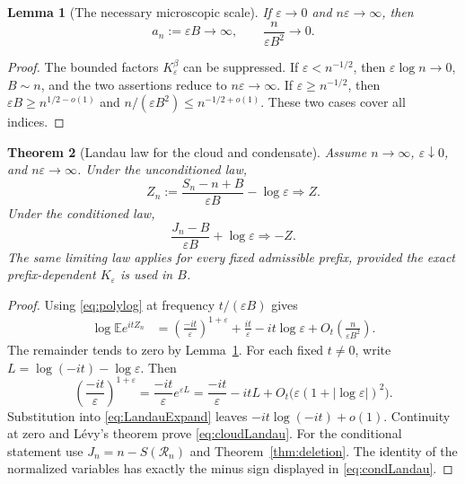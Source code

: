 \documentclass[11pt,a4paper]{article}
\newtheorem{theorem}{Theorem}[section]
\newtheorem{lemma}[theorem]{Lemma}
\theoremstyle{definition}\newtheorem{definition}[theorem]{Definition}
\theoremstyle{remark}\newtheorem{remark}[theorem]{Remark}
\newcommand{\eps}{\varepsilon}
\newcommand{\E}{\mathbb E}
\newcommand{\1}{\mathbf 1}
\begin{document}
\begin{lemma}[The necessary microscopic scale]\label{lem:scale}
If $\eps\to0$ and $n\eps\to\infty$, then
\begin{equation}\label{eq:smallscale}
 a_n:=\eps B\to\infty,
 \qquad \frac n{\eps B^2}\to0.
\end{equation}
\end{lemma}
\begin{proof}
The bounded factors $K_{\eps}^{\beta}$ can be suppressed. If
$\eps<n^{-1/2}$, then $\eps\log n\to0$, $B\sim n$, and the two
assertions reduce to $n\eps\to\infty$. If $\eps\ge n^{-1/2}$, then
$\eps B\ge n^{1/2-o(1)}$ and
$n/(\eps B^2)\le n^{-1/2+o(1)}$. These two cases cover all indices.
\end{proof}

\begin{theorem}[Landau law for the cloud and condensate]
\label{thm:landau}
Assume $n\to\infty$, $\eps\downarrow0$, and $n\eps\to\infty$.
Under the unconditioned law,
\begin{equation}\label{eq:cloudLandau}
 Z_n:=\frac{S_n-n+B}{\eps B}-\log\eps\Longrightarrow Z.
\end{equation}
Under the conditioned law,
\begin{equation}\label{eq:condLandau}
 \frac{J_n-B}{\eps B}+\log\eps\Longrightarrow-Z.
\end{equation}
The same limiting law applies for every fixed admissible prefix, provided
the \emph{exact} prefix-dependent $K_{\eps}$ is used in $B$.
\end{theorem}
\begin{proof}
Using \eqref{eq:polylog} at frequency $t/(\eps B)$ gives
\begin{align}
 \log\E e^{itZ_n}
 &=\left(\frac{-it}{\eps}\right)^{1+\eps}
   +\frac{it}{\eps}-it\log\eps
   +O_t\left(\frac n{\eps B^2}\right).
 \label{eq:LandauExpand}
\end{align}
The remainder tends to zero by Lemma~\ref{lem:scale}. For each fixed
$t\ne0$, write $L=\log(-it)-\log\eps$. Then
\[
 \left(\frac{-it}{\eps}\right)^{1+\eps}
 =\frac{-it}{\eps}e^{\eps L}
 =\frac{-it}{\eps}-itL
   +O_t\bigl(\eps(1+|\log\eps|)^2\bigr).
\]
Substitution into \eqref{eq:LandauExpand} leaves
$-it\log(-it)+o(1)$. Continuity at zero and L\'evy's theorem prove
\eqref{eq:cloudLandau}. For the conditional statement use
$J_n=n-S(\mathcal R_n)$ and Theorem~\ref{thm:deletion}. The identity of
the normalized variables has exactly the minus sign displayed in
\eqref{eq:condLandau}.
\end{proof}
\end{document}
